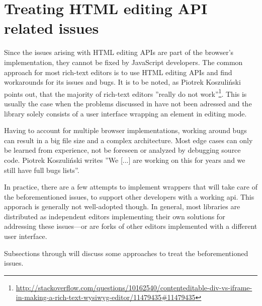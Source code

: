 
\section{Treating HTML editing API related issues}
\label{sec:ed_api_treating}

Since the issues arising with HTML editing APIs are part of the browser's implementation, they cannot be fixed by JavaScript developers. The common approach for most rich-text editors is to use HTML editing APIs and find workarounds for its issues and bugs. It is to be noted, as Piotrek Koszuli\'{n}ski points out, that the majority of rich-text editors ''really do not work''\footnote{\url{http://stackoverflow.com/questions/10162540/contenteditable-div-vs-iframe-in-making-a-rich-text-wysiwyg-editor/11479435\#11479435}}. This is usually the case when the problems discussed in  have not been adressed and the library solely consists of a user interface wrapping an element in editing mode.

Having to account for multiple browser implementations, working around bugs can result in a big file size and a complex architecture. Most edge cases can only be learned from experience, not be foreseen or analyzed by debugging source code. Piotrek Koszuli\'{n}ski writes ''We [...] are working on this for years and we still have full bugs lists''\cite{sopp}.

In practice, there are a few attempts to implement wrappers that will take care of the beforementioned issues, to support other developers with a working api. This apporach is generally not well-adopted though. In general, most libraries are distributed as independent editors implementing their own solutions for addressing these issues---or are forks of other editors implemented with a different user interface.

Subsections  through  will discuss some approaches to treat the beforementioned issues.





